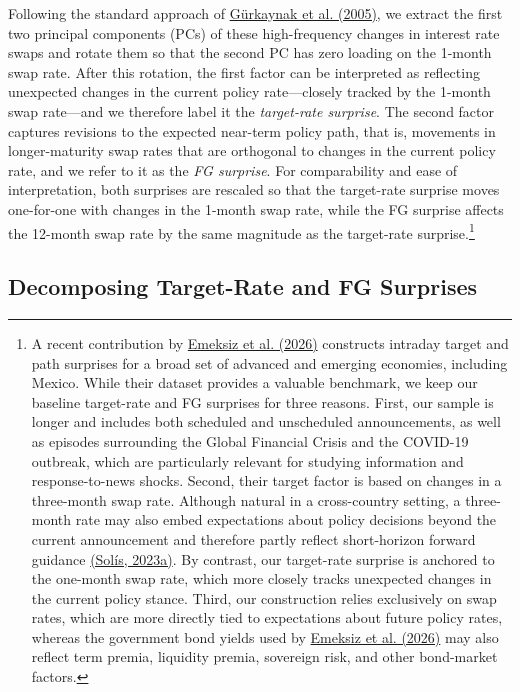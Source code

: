 \documentclass[\latexroot/\projectname]{subfiles}
\begin{document}
Following the standard approach of \hyperlink{Gürkaynak et al. (2005)}{Gürkaynak et al. (2005)}, we extract the first two principal components (PCs) of these high-frequency changes in interest rate swaps and rotate them so that the second PC has zero loading on the 1-month swap rate. After this rotation, the first factor can be interpreted as reflecting unexpected changes in the current policy rate—closely tracked by the 1-month swap rate—and we therefore label it the \emph{target-rate surprise}. The second factor captures revisions to the expected near-term policy path, that is, movements in longer-maturity swap rates that are orthogonal to changes in the current policy rate, and we refer to it as the \emph{FG surprise}. For comparability and ease of interpretation, both surprises are rescaled so that the target-rate surprise moves one-for-one with changes in the 1-month swap rate, while the FG surprise affects the 12-month swap rate by the same magnitude as the target-rate surprise.\footnote{A recent contribution by \hyperlink{Emeksiz et al. (2026)}{Emeksiz et al. (2026)} constructs intraday target and path surprises for a broad set of advanced and emerging economies, including Mexico. While their dataset provides a valuable benchmark, we keep our baseline target-rate and FG surprises for three reasons. First, our sample is longer and includes both scheduled and unscheduled announcements, as well as episodes surrounding the Global Financial Crisis and the COVID-19 outbreak, which are particularly relevant for studying information and response-to-news shocks. Second, their target factor is based on changes in a three-month swap rate. Although natural in a cross-country setting, a three-month rate may also embed expectations about policy decisions beyond the current announcement and therefore partly reflect short-horizon forward guidance \hyperlink{Solis (2023a)}{(Solís, 2023a)}. By contrast, our target-rate surprise is anchored to the one-month swap rate, which more closely tracks unexpected changes in the current policy stance. Third, our construction relies exclusively on swap rates, which are more directly tied to expectations about future policy rates, whereas the government bond yields used by \hyperlink{Emeksiz et al. (2026)}{Emeksiz et al. (2026)} may also reflect term premia, liquidity premia, sovereign risk, and other bond-market factors.}



\subsection{Decomposing Target-Rate and FG Surprises}
\end{document}
